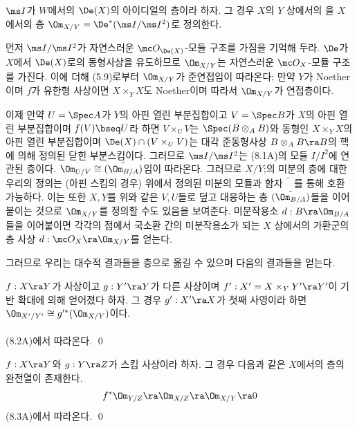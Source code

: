 	
	\begin{definition}
	$\ms I$가 $W$에서의 $\De(X)$의 아이디얼의 층이라 하자.
	그 경우 $X$의 $Y$ 상에서의 을
	$X$에서의 층 $\Om_{X/Y}=\De^*(\ms I/\ms I^2)$로 정의한다.
	\end{definition}
	
	
	\begin{remark}
	먼저 $\ms I/\ms I^2$가 자연스러운 $\mc O_{\De(X)}$-모듈 구조를 가짐을 기억해 두라.
	$\De$가 $X$에서 $\De(X)$로의 동형사상을 유도하므로 $\Om_{X/Y}$는 자연스러운 $\mc O_X$-모듈 구조를 가진다.
	이에 더해 (5.9)로부터 $\Om_{X/Y}$가 준연접임이 따라온다;
	만약 $Y$가 Noether이며 $f$가 유한형 사상이면 $X\times_YX$도 Noether이며 따라서 $\Om_{X/Y}$가 연접층이다.
	\end{remark}
	
	
	\begin{remark}
	이제 만약 $U=\Spec A$가 $Y$의 아핀 열린 부분집합이고 $V=\Spec B$가 $X$의 아핀 열린 부분집합이며 $f(V)\bseq U$라 하면
	$V\times_UV$는 $\Spec(B\otimes_AB)$와 동형인 $X\times_YX$의 아핀 열린 부분집합이며
	$\De(X)\cap(V\times_UV)$는 대각 준동형사상 $B\otimes_AB\ra B$의 핵에 의해 정의된 닫힌 부분스킴이다.
	그러므로 $\ms I/\ms I^2$는 (8.1A)의 모듈 $I/I^2$에 연관된 층이다.
	$\Om_{U/V}\cong\tilde{(\Om_{B/A})}$임이 따라온다.
	그러므로 $X/Y$;의 미분의 층에 대한 우리의 정의는 (아핀 스킴의 경우)
	위에서 정의된 미분의 모듈과 함자 $\tilde{\phantom{X}}$를 통해 호환 가능하다.
	이는 또한 $X,Y$를 위와 같은 $V,U$들로 덮고 대응하는 층 $\tilde{(\Om_{B/A})}$들을
	이어붙이는 것으로 $\Om_{X/Y}$를 정의할 수도 있음을 보여준다.
	미분작용소 $d:B\ra\Om_{B/A}$들을 이어붙이면 각각의 점에서 국소환 간의 미분작용소가 되는
	$X$ 상에서의 가환군의 층 사상 $d:\mc O_X\ra\Om_{X/Y}$를 얻는다.
	\end{remark}
	
	그러므로 우리는 대수적 결과들을 층으로 옮길 수 있으며 다음의 결과들을 얻는다.
	
	
	\begin{proposition}
	$f:X\ra Y$가 사상이고 $g:Y'\ra Y$가 다른 사상이며 $f':X'=X\times_YY'\ra Y'$이 기반 확대에 의해 얻어졌다 하자.
	그 경우 $g':X'\ra X$가 첫째 사영이라 하면 $\Om_{X'/Y'}\cong g'^*(\Om_{X/Y})$이다.\\\\
	\pf (8.2A)에서 따라온다.
	\qed
	\end{proposition}
	
	
	\begin{proposition}
	$f:X\ra Y$와 $g:Y\ra Z$가 스킴 사상이라 하자. 그 경우 다음과 같은 $X$에서의 층의 완전열이 존재한다.
	$$f^*\Om_{Y/Z}\ra\Om_{X/Z}\ra\Om_{X/Y}\ra 0$$
	\pf (8.3A)에서 따라온다.
	\qed
	\end{proposition}
	
